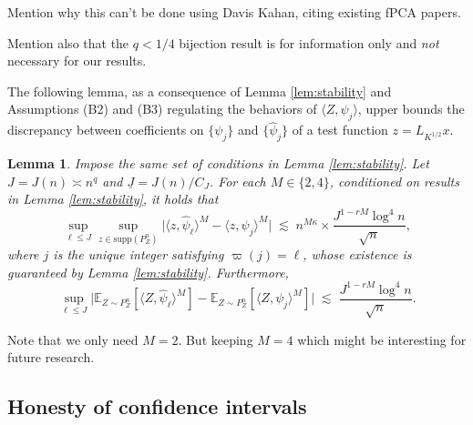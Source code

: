 \documentclass[aos]{imsart}
\renewcommand{\hat}{\widehat}
\newcommand{\supp}{\mathrm{supp}}
\newcommand{\und}{\underline}
\theoremstyle{plain}
\newtheorem{lemma}{Lemma}[section]
\theoremstyle{definition}
\theoremstyle{definition}
\begin{document}
{\color{red} Mention why this can't be done using Davis Kahan, citing existing fPCA papers.}

{\color{red} Mention also that the $q<1/4$ bijection result is for information only and \emph{not} necessary for our results.}


The following lemma, as a consequence of Lemma \ref{lem:stability} and Assumptions (B2) and (B3) regulating the behaviors of $\langle Z,\psi_j\rangle$,
upper bounds the discrepancy between coefficients on $\{\psi_j\}$ and $\{\hat\psi_j\}$ of a test function $z=L_{K^{1/2}}x$.
\begin{lemma}
Impose the same set of conditions in Lemma \ref{lem:stability}.
Let $J=J(n)\asymp n^q$ and $\und J=J(n)/C_J$.
For each $M\in\{2,4\}$, conditioned on results in Lemma \ref{lem:stability},
it holds that
$$
\sup_{\ell\leq J}\sup_{z\in\supp(P_Z^n)}\big|\langle z,\hat\psi_\ell\rangle^M - \langle z,\psi_j\rangle^M\big|\; \lesssim\; n^{M\kappa}\times \frac{J^{1-rM}\log^4 n}{\sqrt{n}},
$$
where $j$ is the unique integer satisfying $\varpi(j)=\ell$, whose existence is guaranteed by Lemma \ref{lem:stability}.
Furthermore, 
$$
\sup_{\ell\leq J}\bigg|\mathbb E_{Z\sim P_Z^n}\left[\langle Z,\hat\psi_\ell\rangle^M\right] -\mathbb E_{Z\sim P_Z^n}\left[\langle Z,\psi_j\rangle^M\right]\bigg|
\;\lesssim\;\frac{J^{1-rM}\log^4 n}{\sqrt{n}}.
$$
\label{lem:zpsi-stability}
\end{lemma}

{\color{orange} Note that we only need $M=2$. But keeping $M=4$ which might be interesting for future research.}

\subsection{Honesty of confidence intervals}
\end{document}
